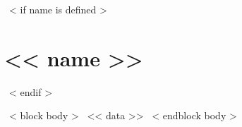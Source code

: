 ~< if name is defined >~\section{<< name >>}~< endif >~

    ~< block body >~
      << data >>
    ~< endblock body >~
